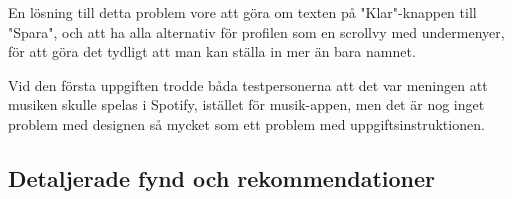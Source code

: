 \documentclass[a4paper,12pt,titlepage]{article}
\begin{document}
En lösning till detta problem vore att göra om texten på "Klar"-knappen till
"Spara", och att ha alla alternativ för profilen som en scrollvy med
undermenyer, för att göra det tydligt att man kan ställa in mer än bara namnet.

Vid den första uppgiften trodde båda testpersonerna att det var meningen att
musiken skulle spelas i Spotify, istället för musik-appen, men det är nog inget
problem med designen så mycket som ett problem med uppgiftsinstruktionen.

\subsection*{Detaljerade fynd och rekommendationer}
\end{document}
